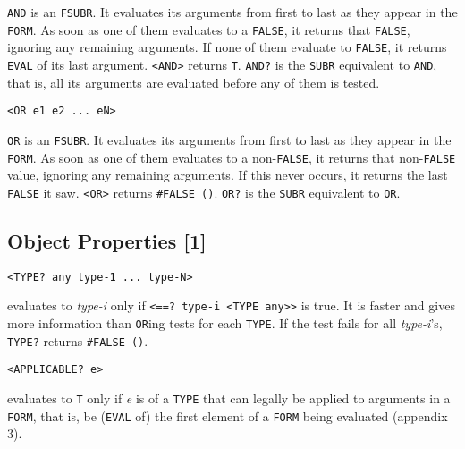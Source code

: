 \documentclass[a4paper]{scrbook}
\begin{document}
\texttt{AND}  is an \texttt{FSUBR}. It evaluates its arguments from first
to last as they appear in the \texttt{FORM}. As soon as one of them evaluates to a \texttt{FALSE}, it returns that
\texttt{FALSE}, ignoring any remaining arguments. If none of them evaluate to \texttt{FALSE}, it returns \texttt{EVAL} of
its last argument. \texttt{\textless{}AND\textgreater{}} returns \texttt{T}. \texttt{AND?}  is
the \texttt{SUBR} equivalent to \texttt{AND}, that is, all its arguments are evaluated before any of them is tested.

\begin{verbatim}
<OR e1 e2 ... eN>
\end{verbatim}

 \texttt{OR} is an \texttt{FSUBR}. It evaluates its arguments from first to last as they appear
in the \texttt{FORM}. As soon as one of them evaluates to a non-\texttt{FALSE}, it returns that non-\texttt{FALSE} value,
ignoring any remaining arguments. If this never occurs, it returns the last \texttt{FALSE} it saw.
\texttt{\textless{}OR\textgreater{}} returns \texttt{\#FALSE\ ()}. \texttt{OR?} is the
\texttt{SUBR} equivalent to \texttt{OR}.

\subsection{Object Properties {[}1{]}}\label{object-properties-1}

\begin{verbatim}
<TYPE? any type-1 ... type-N>
\end{verbatim}

 evaluates to \emph{type-i} only if
\texttt{\textless{}==?\ type-i\ \textless{}TYPE\ any\textgreater{}\textgreater{}} is true. It is
faster and gives more information than \texttt{OR}ing tests for each \texttt{TYPE}. If the test fails for all
\emph{type-i}'s, \texttt{TYPE?} returns \texttt{\#FALSE\ ()}.

\begin{verbatim}
<APPLICABLE? e>
\end{verbatim}

 evaluates to \texttt{T} only if \emph{e} is of a \texttt{TYPE} that can legally be
applied to arguments in a \texttt{FORM}, that is, be (\texttt{EVAL} of) the first element of a \texttt{FORM} being
evaluated (appendix 3).
\end{document}
